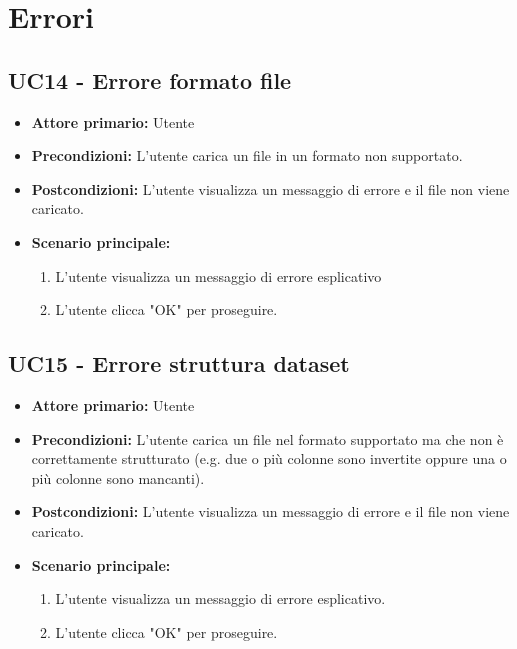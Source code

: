 \newpage


\section{Errori}
\subsection{UC14 - Errore formato file}
\label{sec:UC14 - Errore formato file}
\begin{itemize}
    \item \textbf{Attore primario:} Utente
    \item \textbf{Precondizioni:} L'utente carica un file in un formato non supportato.
    \item \textbf{Postcondizioni:} L'utente visualizza un messaggio di errore e il file non viene caricato.
    \item \textbf{Scenario principale:}
          \begin{enumerate}
              \item L'utente visualizza un messaggio di errore esplicativo
              \item L'utente clicca "OK" per proseguire.
          \end{enumerate}
\end{itemize}

\subsection{UC15 - Errore struttura dataset}
\label{sec:UC15 - Errore struttura dataset}
\begin{itemize}
    \item \textbf{Attore primario:} Utente
    \item \textbf{Precondizioni:} L'utente carica un file nel formato supportato ma che non è correttamente strutturato  
                                  (e.g. due o più colonne sono invertite oppure una o più colonne sono mancanti). 
    \item \textbf{Postcondizioni:} L'utente visualizza un messaggio di errore e il file non viene caricato.
    \item \textbf{Scenario principale:}
          \begin{enumerate}
              \item L'utente visualizza un messaggio di errore esplicativo.
              \item L'utente clicca "OK" per proseguire.
          \end{enumerate} 
\end{itemize}

